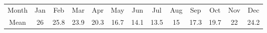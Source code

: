 \begin{tabular}{ccccccccccccc} \toprule
Month & Jan & Feb  & Mar  & Apr  & May  & Jun  & Jul  & Aug & Sep  & Oct  & Nov & Dec \\
Mean  & 26  & 25.8 & 23.9 & 20.3 & 16.7 & 14.1 & 13.5 & 15  & 17.3 & 19.7 & 22  & 24.2 \\\bottomrule
\end{tabular}
